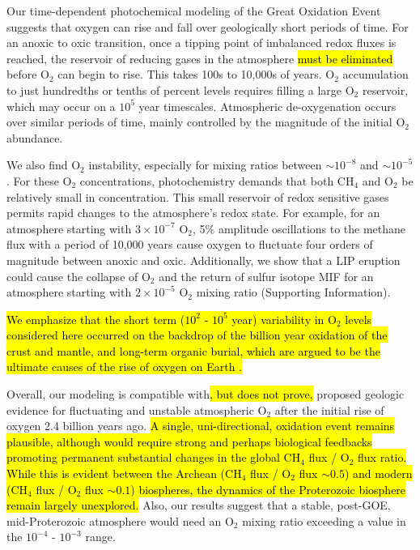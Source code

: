 \documentclass[9pt,twocolumn,twoside,lineno]{pnas-new}
\begin{document}
Our time-dependent photochemical modeling of the Great Oxidation Event suggests that oxygen can rise and fall over geologically short periods of time. For an anoxic to oxic transition, once a tipping point of imbalanced redox fluxes is reached, the reservoir of reducing gases in the atmosphere \hl{must be eliminated} before O$_2$ can begin to rise. This takes 100s to 10,000s of years. O$_2$ accumulation to just hundredths or tenths of percent levels requires filling a large O$_2$ reservoir, which may occur on a $10^5$ year timescales. Atmospheric de-oxygenation occurs over similar periods of time, mainly controlled by the magnitude of the initial O$_2$ abundance.

We also find O$_2$ instability, especially for mixing ratios between $\sim10^{-8}$ and $\sim10^{-5}$. For these O$_2$ concentrations, photochemistry demands that both CH$_4$ and O$_2$ be relatively small in concentration. This small reservoir of redox sensitive gases permits rapid changes to the atmosphere’s redox state. For example, for an atmosphere starting with $3 \times 10^{-7}$ O$_2$, 5\% amplitude oscillations to the methane flux with a period of 10,000 years cause oxygen to fluctuate four orders of magnitude between anoxic and oxic. Additionally, we show that a LIP eruption could cause the collapse of O$_2$ and the return of sulfur isotope MIF for an atmosphere starting with $2 \times 10^{-5}$ O$_2$ mixing ratio (Supporting Information).

\hl{We emphasize that the short term ($10^2$ - $10^5$ year) variability in O$_2$ levels considered here occurred on the backdrop of the billion year oxidation of the crust and mantle, and long-term organic burial, which are argued to be the ultimate causes of the rise of oxygen on Earth \mbox{\citep[e.g.][]{Catling_2001}}.}

Overall, our modeling is compatible with\hl{, but does not prove,} proposed geologic evidence for fluctuating and unstable atmospheric O$_2$ after the initial rise of oxygen 2.4 billion years ago. \hl{A single, uni-directional, oxidation event remains plausible, although would require strong and perhaps biological feedbacks promoting permanent substantial changes in the global CH$_4$ flux / O$_2$ flux ratio. While this is evident between the Archean (CH$_4$ flux / O$_2$ flux $\sim 0.5$) and modern (CH$_4$ flux / O$_2$ flux $\sim 0.1$) biospheres, the dynamics of the Proterozoic biosphere remain largely unexplored.} Also, our results suggest that a stable, post-GOE, mid-Proterozoic atmosphere would need an O$_2$ mixing ratio exceeding a value in the $10^{-4}$ - $10^{-3}$ range. 
\end{document}
